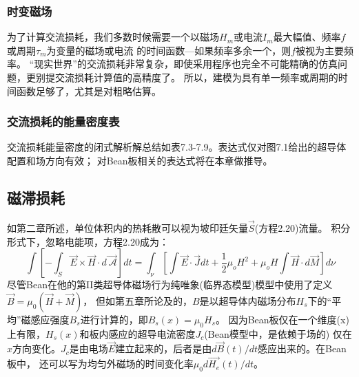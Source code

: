 \subsubsection*{时变磁场}
为了计算交流损耗，我们多数时候需要一个以磁场$H_m$或电流$I_m$最大幅值、频率$f$或周期$\tau_m$为变量的磁场或电流
的时间函数---如果频率多余一个，则$f$被视为主要频率。
“现实世界”的交流损耗非常复杂，即使采用程序也完全不可能精确的仿真问题，更别提交流损耗计算值的高精度了。
所以，建模为具有单一频率或周期的时间函数足够了，尤其是对粗略估算。

\subsubsection*{交流损耗的能量密度表}
交流损耗能量密度的闭式解析解总结如表7.3-7.9。表达式仅对图7.1给出的超导体配置和场方向有效；
对Bean板相关的表达式将在本章做推导。

\subsection{磁滞损耗}
如第二章所述，单位体积内的热耗散可以视为坡印廷矢量$\vec{S}$(方程2.20)流量。
积分形式下，忽略电能项，方程2.20成为：
\begin{equation}%
\int\left[-\int_{S}^{}\vec{E}\times\vec{H}\cdot d\vec{\ \mathcal{A}}\right]dt=\int_{\nu}^{}\left[\int\vec{E}\cdot\vec{J}dt+\frac{1}{2}\mu_oH^2+\mu_oH\int\vec{H}\cdot d\vec{M}\right]d\nu
\end{equation}
尽管Bean在他的第II类超导体磁场行为纯唯象(临界态模型)模型中使用了定义$\vec{B}=\mu_0(\vec{H}+\vec{M})$，
但如第五章所论及的，$B$是以超导体内磁场分布$H_s$下的“平均”磁感应强度$B_s$进行计算的，即$B_s(x)=\mu_0 H_s$。
因为Bean板仅在一个维度(x)上有限，$H_s(x)$和板内感应的超导电流密度$J_c$(Bean模型中，是依赖于场的)
仅在$x$方向变化。$J_c$是由电场$\vec{E}$建立起来的，后者是由$d\vec{B}(t)/dt$感应出来的。在Bean板中，
还可以写为均匀外磁场的时间变化率$\mu_0 d\vec{H_e}(t)/dt$。

